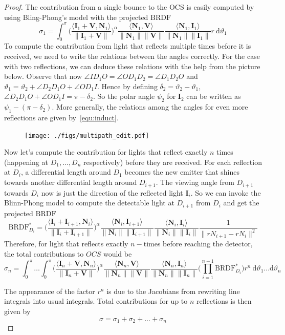 \documentclass[11pt,reqno]{amsart}
\newcommand{\BRDF}{\mathrm{BRDF}}
\newcommand{\ip}[2]{\langle {#1}, {#2} \rangle}
\theoremstyle{definition}
\begin{document}
\begin{proof}
The contribution from a single bounce to the OCS is easily computed by using
Bling-Phong's model with the projected $\BRDF$
$$\sigma_1 =\int_{0}^{\pi}\Bigg(\frac{\ip{\mathbf{I}_1+\mathbf{V}}{\mathbf{N}_1}}{\|\mathbf{I}_1+\mathbf{V}\|}\Bigg)^\alpha\frac{\ip{\mathbf{N}_1}{\mathbf{V}}}{\|\mathbf{N}_1\| \|\mathbf{V}\|}\frac{\ip{\mathbf{N}_1}{\mathbf{I}_1}}{\|\mathbf{N}_1\| \|\mathbf{I}_1\|} r\:\mathrm{d}\vartheta_1$$
To compute the contribution from light that reflects multiple times before it is received, we need to write the relations between the angles correctly. For the case with two reflections, we can deduce these relations with the help from the picture below. Observe that now
$\angle{ID_1O}=\angle{OD_1D_2}=\angle{D_1D_2O}$ and $\vartheta_1=\vartheta_2+\angle{D_2D_1O}+\angle{OD_1I}$. Hence by defining $\delta_2=\vartheta_2-\vartheta_1$, $\angle{D_2D_1O}+\angle{OD_1I}=\pi-\delta_2$. So the polar angle $\psi_2$ for $\mathbf{I}_2$ can be written as $\psi_1-(\pi-\delta_2)$.  More generally,  the relations among the angles for even more reflections are given 
by~\eqref{equ:induct}.
\begin{figure}[H]
  \texttt{[image: ./figs/multipath\_edit.pdf]}
  \label{fig:reflection}
\end{figure}

Now let's compute the contribution for lights that reflect exactly $n$ times (happening at $D_1,...,D_n$ respectively) before they are received. For each reflection at $D_i$, a differential length around $D_1$ becomes the new emitter that shines towards another differential length around $D_{i+1}$. The viewing angle from $D_{i+1}$ towards $D_i$ now is just the direction of the reflected light $\mathbf{I}_{i}$. So we can invoke the Blinn-Phong model to compute the detectable light at $D_{i+1}$ from $D_i$ and get the projected $\BRDF$
$$\BRDF^*_{D_i}= \Bigg(\frac{\ip{\mathbf{I}_i+\mathbf{I}_{i+1}}{\mathbf{N}_i}}{\|\mathbf{I}_i+\mathbf{I}_{i+1}\|}\Bigg)^\alpha \frac{\ip{\mathbf{N}_i}{\mathbf{I}_{i+1}}}{\|\mathbf{N}_i\| \|\mathbf{I}_{i+1}\|}\frac{\ip{\mathbf{N}_i}{\mathbf{I}_i}}{\|\mathbf{N}_i\| \|\mathbf{I}_i\|}\frac{1}{\|rN_{i+1}-rN_i\|^2}$$
Therefore, for light that reflects exactly $n-$times before reaching the detector, the total contributions to $OCS$ would be 
\begin{equation*}
\sigma_n =\int_{0}^{\pi}\ldots \int_{0}^{\pi}\Bigg(\frac{\ip{\mathbf{I}_n+\mathbf{V}}{\mathbf{N}_n}}{\|\mathbf{I}_n+\mathbf{V}\|}\Bigg)^\alpha\frac{\ip{\mathbf{N}_n}{\mathbf{V}}}{\|\mathbf{N}_n\| \|\mathbf{V}\|}\frac{\ip{\mathbf{N}_n}{\mathbf{I}_n}}{\|\mathbf{N}_n\| \|\mathbf{I}_n\|}\bigg(\prod_{i=1}^{n-1}\BRDF^*_{D_i}\bigg) r^n\: \mathrm{d}\vartheta_1...\mathrm{d}\vartheta_n
\end{equation*}

The appearance of the factor $r^n$ is due to the Jacobians from rewriting line integrals into usual integrals. Total contributions for up to $n$ reflections is then given by
 $$ \sigma= \sigma_1+\sigma_2+...+\sigma_n$$
 \end{proof}
 
\end{document}
